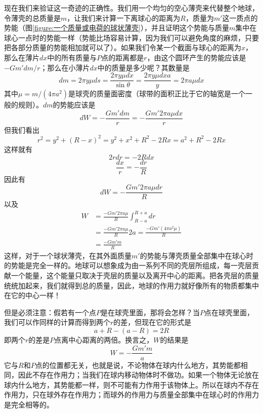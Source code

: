现在我们来验证这一奇迹的正确性。我们用一个均匀的空心薄壳来代替整个地球，令薄壳的总质量是$m$，让我们来计算一下离球心的距离为$R$，质量为$m'$这一质点的势能（图\ref{figure:一个质量或电荷的球状薄壳}），并且证明这个势能与质量$m$集中在球心一点时的势能一样（势能比场容易计算，因为我们可以避免角度的麻烦，只要把各部分质量的势能相加就可以了）。如果我们令某一个截面与球心的距离为$x$，那么在薄片$dx$中的所有质量与$P$点的距离都是$r$，由这个圆环产生的势能应该是$-Gm'dm/r$；那么在小薄片$dx$中的质量是多少呢？其数量是
\begin{equation*}
    dm = 2 \pi y \mu ds = \frac{2 \pi y \mu dx}{\sin\theta} = \frac{2 \pi y \mu dx a}{y} = 2 \pi a \mu dx
\end{equation*}
其中$\mu=m/(4\pi a^2)$是球壳的质量面密度（球带的面积正比于它的轴宽是一个一般的规则）。$dm$的势能应该是
\begin{equation*}
    dW=-\frac{Gm'dm}{r} = -\frac{Gm'2\pi a \mu dx}{r}
\end{equation*}
但我们看出
\begin{equation*}
    r^2=y^2+(R-x)^2=y^2+x^2+R^2-2Rx=a^2+R^2-2Rx
\end{equation*}
这样就有
\begin{equation*}
    2rdr=-2Rdx
\end{equation*}
\begin{equation*}
    \frac{dx}{r}=-\frac{dr}{R}
\end{equation*}
因此有
\begin{equation*}
    dW=-\frac{Gm'2 \pi a \mu dr}{R}
\end{equation*}
以及
\begin{equation}
    \label{Eq:I:13:18}
    \begin{aligned}
        W&=\frac{-Gm'2\pi a \mu}{R} \int_{R-a}^{R+a} dr \\
        &=\frac{-Gm'2\pi a \mu}{R}2a=\frac{-Gm'(4 \pi a^2 \mu)}{R} \\
        &=\frac{-Gm'm}{R}
    \end{aligned}
\end{equation}
这样，对于一个球状薄壳，在其外面质量$m'$的势能与薄壳质量全部集中在球心时的势能是完全一样的。地球可以想象成为由一系列不同的壳层所组成，每一壳层贡献一个能量，这个能量只取决于壳层的质量以及离开中心的距离。把各壳层的质量统统加起来，我们就得到总的质量，因此，地球的作用力就好像所有的物质都集中在它的中心一样！

但是必须注意：假若有一个点$P$是在球壳里面，那将会怎样？当$P$点在球壳里面，我们可以作同样的计算而得到两个$r$的差，但现在它的形式是
\begin{equation*}
    a+R-(a-R)=2R
\end{equation*}
即两个$r$的差是$P$点离中心距离的两倍。换言之，$W$的结果是
\begin{equation*}
    W=-\frac{Gm'm}{a}
\end{equation*}
它与$R$和$P$点的位置都无关，也就是说，不论物体在球内什么地方，其势能都相同，因此不存在作用力；当我们在球内移动物体时不做功。如果一个物体无论放在球内什么地方，其势能都一样，则不可能有力作用于该物体上。所以在球内不存在作用力，只在球外存在作用力；而球外的作用力与质量全部集中在球心时的作用力是完全相等的。